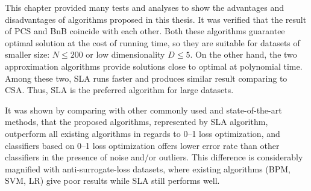 This chapter provided many tests and analyses to show the advantages and disadvantages of algorithms proposed in this thesis. It was verified that the result of PCS and BnB coincide with each other. Both these algorithms guarantee optimal solution at the cost of running time, so they are suitable for datasets of smaller size: $N \leq 200$ or low dimensionality $D \leq 5$. On the other hand, the two approximation algorithms provide solutions close to optimal at polynomial time. Among these two, SLA runs faster and produces similar result comparing to CSA. Thus, SLA is the preferred algorithm for large datasets.

It was shown by comparing with other commonly used and state-of-the-art methods, that the proposed algorithms, represented by SLA algorithm, outperform all existing algorithms in regards to 0--1 loss optimization, and classifiers based on 0--1 loss optimization offers lower error rate than other classifiers in the presence of noise and/or outliers. This difference is considerably magnified with anti-surrogate-loss datasets, where existing algorithms (BPM, SVM, LR) give poor results while SLA still performs well. 

